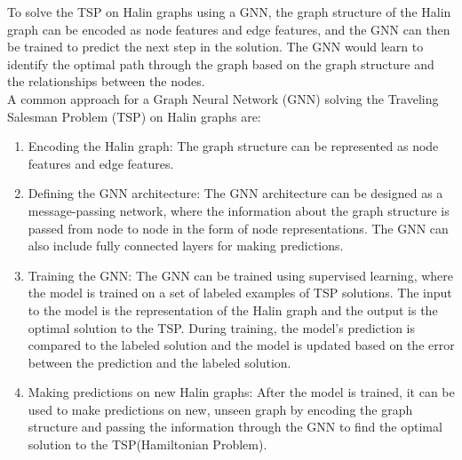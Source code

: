 \documentclass{article}
\begin{document}
To solve the TSP on Halin graphs using a GNN, the graph structure of the Halin graph can be encoded as node features and edge features, and the GNN can then be trained to predict the next step in the solution. The GNN would learn to identify the optimal path through the graph based on the graph structure and the relationships between the nodes.\\
 A common approach for a Graph Neural Network (GNN) solving the Traveling Salesman Problem (TSP) on Halin graphs are:\\
 \begin{enumerate}
    
 
 \item Encoding the Halin graph: The graph structure can be represented as node features and edge features. 

\item Defining the GNN architecture: The GNN architecture can be designed as a message-passing network, where the information about the graph structure is passed from node to node in the form of node representations. The GNN can also include fully connected layers for making predictions.

\item Training the GNN: The GNN can be trained using supervised learning, where the model is trained on a set of labeled examples of TSP solutions. The input to the model is the representation of the Halin graph and the output is the optimal solution to the TSP. During training, the model's prediction is compared to the labeled solution and the model is updated based on the error between the prediction and the labeled solution.

\item Making predictions on new Halin graphs: After the model is trained, it can be used to make predictions on new, unseen  graph by encoding the graph structure and passing the information through the GNN to find the optimal solution to the TSP(Hamiltonian Problem).
\end{enumerate}
\end{document}
